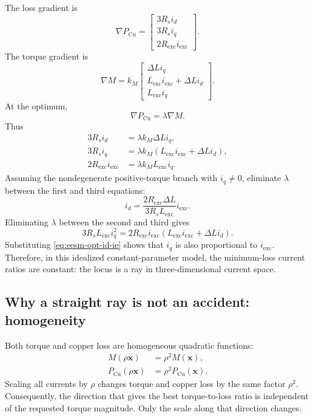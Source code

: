 \documentclass[11pt,a4paper]{article}
\newcommand{\id}{i_d}
\newcommand{\iq}{i_q}
\newcommand{\ie}{i_{\mathrm{exc}}}
\newcommand{\Rs}{R_s}
\newcommand{\Rexc}{R_{\mathrm{exc}}}
\newcommand{\Lexc}{L_{\mathrm{exc}}}
\newcommand{\vct}[1]{\bm{#1}}
\begin{document}
The loss gradient is
\begin{equation}
  \nabla P_{\mathrm{Cu}}
  =
  \begin{bmatrix}
  3\Rs\id\\
  3\Rs\iq\\
  2\Rexc\ie
  \end{bmatrix}.
  \label{eq:grad-pcu}
\end{equation}
The torque gradient is
\begin{equation}
  \nabla M
  =k_M
  \begin{bmatrix}
  \Delta L\iq\\
  \Lexc\ie+\Delta L\id\\
  \Lexc\iq
  \end{bmatrix}.
  \label{eq:grad-eesm-torque}
\end{equation}
At the optimum,
\begin{equation}
  \nabla P_{\mathrm{Cu}}=\lambda\nabla M.
  \label{eq:eesm-minloss-lagrange}
\end{equation}
Thus
\begin{align}
  3\Rs\id &= \lambda k_M\Delta L\iq,\\
  3\Rs\iq &= \lambda k_M(\Lexc\ie+\Delta L\id),\\
  2\Rexc\ie &= \lambda k_M\Lexc\iq.
  \label{eq:eesm-lagrange-components}
\end{align}
Assuming the nondegenerate positive-torque branch with $\iq\neq0$, eliminate $\lambda$ between the first and third equations:
\begin{equation}
  \boxed{
  \id
  =\frac{2\Rexc\Delta L}{3\Rs\Lexc}\ie.
  }
  \label{eq:eesm-opt-id-ie}
\end{equation}
Eliminating $\lambda$ between the second and third gives
\begin{equation}
  3\Rs\Lexc\iq^2
  =2\Rexc\ie(\Lexc\ie+\Delta L\id).
  \label{eq:eesm-opt-iq}
\end{equation}
Substituting \eqref{eq:eesm-opt-id-ie} shows that $\iq$ is also proportional to $\ie$. Therefore, in this idealized constant-parameter model, the minimum-loss current ratios are constant: the locus is a ray in three-dimensional current space.

\subsection{Why a straight ray is not an accident: homogeneity}

Both torque and copper loss are homogeneous quadratic functions:
\begin{align}
  M(\rho\vct x)&=\rho^2M(\vct x),\\
  P_{\mathrm{Cu}}(\rho\vct x)&=\rho^2P_{\mathrm{Cu}}(\vct x).
\end{align}
Scaling all currents by $\rho$ changes torque and copper loss by the same factor $\rho^2$. Consequently, the direction that gives the best torque-to-loss ratio is independent of the requested torque magnitude. Only the scale along that direction changes.
\end{document}
